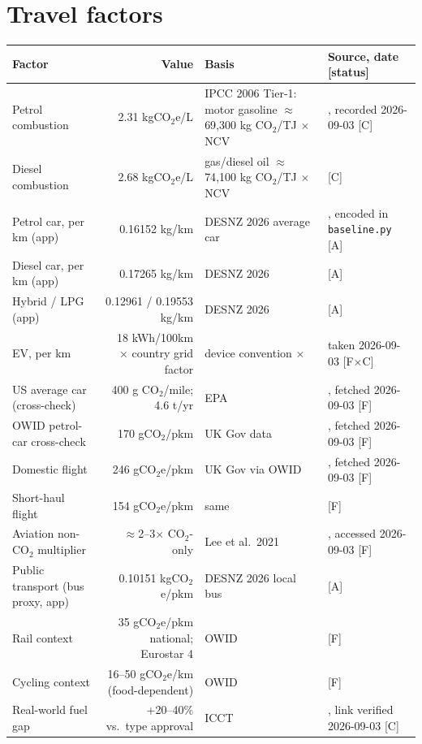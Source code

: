 \documentclass[11pt,a4paper]{article}
\begin{document}
\section{Travel factors}

\begin{longtable}{@{}p{5.2cm}rp{6.2cm}l@{}}
\toprule
Factor & Value & Basis & Source, date [status] \\
\midrule
Petrol combustion & 2.31 kgCO$_2$e/L & IPCC 2006 Tier-1: motor gasoline $\approx$69{,}300 kg CO$_2$/TJ $\times$ NCV & \cite{ipcc2006_vol2}, recorded 2026-09-03 [C] \\
Diesel combustion & 2.68 kgCO$_2$e/L & gas/diesel oil $\approx$74{,}100 kg CO$_2$/TJ $\times$ NCV & \cite{ipcc2006_vol2} [C] \\
Petrol car, per km (app) & 0.16152 kg/km & DESNZ 2026 average car & \cite{desnz2026}, encoded in \texttt{baseline.py} [A] \\
Diesel car, per km (app) & 0.17265 kg/km & DESNZ 2026 & \cite{desnz2026} [A] \\
Hybrid / LPG (app) & 0.12961 / 0.19553 kg/km & DESNZ 2026 & \cite{desnz2026} [A] \\
EV, per km & 18 kWh/100km $\times$ country grid factor & device convention $\times$ \cite{ember_grid} & taken 2026-09-03 [F$\times$C] \\
US average car (cross-check) & 400 g CO$_2$/mile; 4.6 t/yr & EPA & \cite{epa_vehicle}, fetched 2026-09-03 [F] \\
OWID petrol-car cross-check & 170 gCO$_2$/pkm & UK Gov data & \cite{owid_travel}, fetched 2026-09-03 [F] \\
Domestic flight & 246 gCO$_2$e/pkm & UK Gov via OWID & \cite{owid_travel}, fetched 2026-09-03 [F] \\
Short-haul flight & 154 gCO$_2$e/pkm & same & \cite{owid_travel} [F] \\
Aviation non-CO$_2$ multiplier & $\approx$2--3$\times$ CO$_2$-only & Lee et al.\ 2021 & \cite{lee2021}, accessed 2026-09-03 [F] \\
Public transport (bus proxy, app) & 0.10151 kgCO$_2$e/pkm & DESNZ 2026 local bus & \cite{desnz2026} [A] \\
Rail context & 35 gCO$_2$e/pkm national; Eurostar 4 & OWID & \cite{owid_travel} [F] \\
Cycling context & 16--50 gCO$_2$e/km (food-dependent) & OWID & \cite{owid_travel} [F] \\
Real-world fuel gap & +20--40\% vs.\ type approval & ICCT & \cite{icct_realworld}, link verified 2026-09-03 [C] \\
\bottomrule
\end{longtable}
\end{document}
